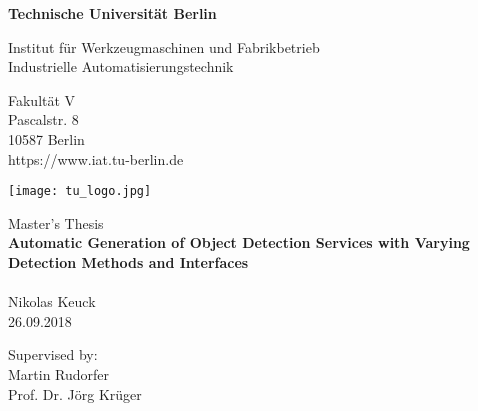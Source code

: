 \thispagestyle{empty}
\begin{center}

\vspace*{1.4cm}
{\LARGE \textbf{Technische Universität Berlin}}

\vspace{0.5cm}

{\large Institut für Werkzeugmaschinen und Fabrikbetrieb\\[1mm]}
{\large Industrielle Automatisierungstechnik\\[5mm]}

Fakultät V\\
Pascalstr. 8\\
10587 Berlin\\
https://www.iat.tu-berlin.de\\

\vspace*{1cm}

\texttt{[image: tu\_logo.jpg]}

\vspace*{1.0cm}

{\LARGE Master's Thesis}\\

\vspace{1.0cm}
{\LARGE \textbf{Automatic Generation of Object Detection Services with Varying Detection Methods and Interfaces}}\\
{\LARGE \textbf{}}\\
\vspace*{0.5cm}
{\LARGE Nikolas Keuck}
\\
\vspace*{0.5cm}
26.09.2018\\ %
\vspace*{0.5cm}

Supervised by:\\
\vspace{0.2cm}
Martin Rudorfer\\
Prof. Dr. Jörg Krüger


\end{center}

